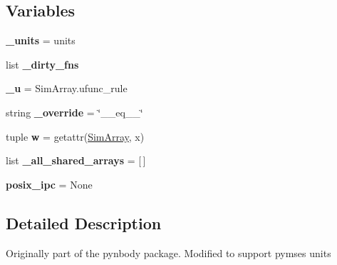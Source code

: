 \subsection*{Variables}
\begin{DoxyCompactItemize}
\item 
\hypertarget{namespaceseren3_1_1array_a638f1a9bcd9fdc669350156b8ba4390a}{
{\bfseries \_\-units} = units}
\label{namespaceseren3_1_1array_a638f1a9bcd9fdc669350156b8ba4390a}

\item 
list {\bfseries \_\-dirty\_\-fns}
\item 
\hypertarget{namespaceseren3_1_1array_a3748270125f03db33744952cf2ff6efb}{
{\bfseries \_\-u} = SimArray.ufunc\_\-rule}
\label{namespaceseren3_1_1array_a3748270125f03db33744952cf2ff6efb}

\item 
\hypertarget{namespaceseren3_1_1array_a07245ef42d438e6cc9df80e8fd2ad9e4}{
string {\bfseries \_\-override} = \char`\"{}\_\-\_\-eq\_\-\_\-\char`\"{}}
\label{namespaceseren3_1_1array_a07245ef42d438e6cc9df80e8fd2ad9e4}

\item 
\hypertarget{namespaceseren3_1_1array_afe2c084b77ec4c9a38daec47016b75ea}{
tuple {\bfseries w} = getattr(\hyperlink{classseren3_1_1array_1_1SimArray}{SimArray}, x)}
\label{namespaceseren3_1_1array_afe2c084b77ec4c9a38daec47016b75ea}

\item 
\hypertarget{namespaceseren3_1_1array_a5b29e2ff0eb310026992e7ae604ae073}{
list {\bfseries \_\-all\_\-shared\_\-arrays} = \mbox{[}$\,$\mbox{]}}
\label{namespaceseren3_1_1array_a5b29e2ff0eb310026992e7ae604ae073}

\item 
\hypertarget{namespaceseren3_1_1array_a1c060f68117c679d638a00cd7aa21406}{
{\bfseries posix\_\-ipc} = None}
\label{namespaceseren3_1_1array_a1c060f68117c679d638a00cd7aa21406}

\end{DoxyCompactItemize}


\subsection{Detailed Description}
\begin{DoxyVerb}
Originally part of the pynbody package. Modified to support pymses units
\end{DoxyVerb}
 

